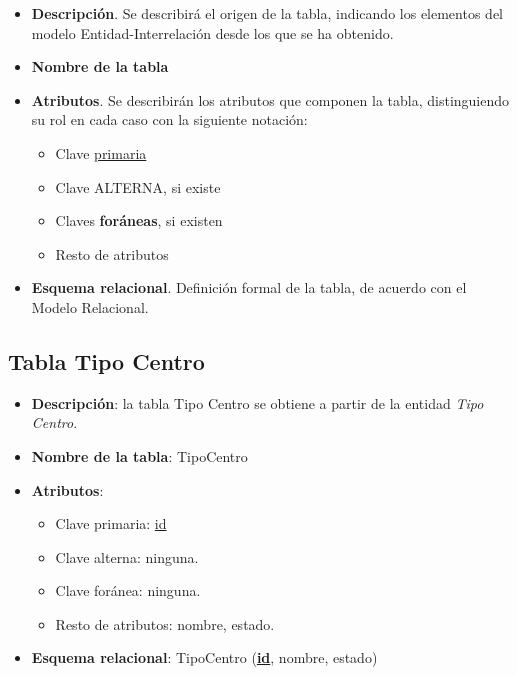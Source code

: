 \begin{itemize}
    \item \textbf{Descripción}. Se describirá el origen de la tabla, indicando los elementos del modelo Entidad-Interrelación desde los que se ha obtenido.
    \item \textbf{Nombre de la tabla}
    \item \textbf{Atributos}. Se describirán los atributos que componen la tabla, distinguiendo su rol en cada caso con la siguiente notación:
        \begin{itemize}
            \item Clave \underline{primaria}
            \item Clave ALTERNA, si existe
            \item Claves \textbf{foráneas}, si existen
            \item Resto de atributos
        \end{itemize}
    \item \textbf{Esquema relacional}. Definición formal de la tabla, de acuerdo con el Modelo Relacional.
\end{itemize}

\subsection{Tabla Tipo Centro}
    \begin{itemize}
        \item \textbf{Descripción}: la tabla Tipo Centro se obtiene a partir de la entidad \textit{Tipo Centro}.
        \item \textbf{Nombre de la tabla}: TipoCentro
        \item \textbf{Atributos}:
            \begin{itemize}
                \item Clave primaria: \underline{id}
                \item Clave alterna: ninguna.
                \item Clave foránea: ninguna.
                \item Resto de atributos: nombre, estado.
            \end{itemize}
        \item \textbf{Esquema relacional}: 
            TipoCentro (\textbf{\underline{id}}, nombre, estado)
    \end{itemize}

